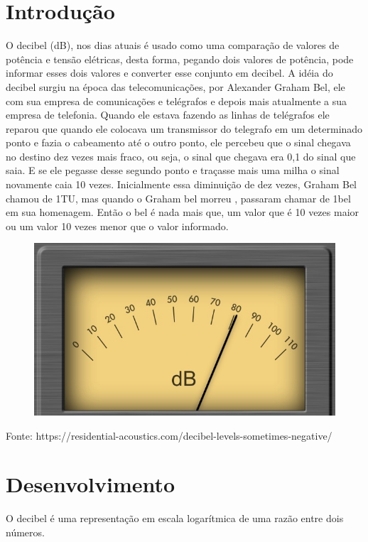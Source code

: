 \documentclass{article}
\begin{document}
\section{Introdução}
    O decibel (dB), nos dias atuais é usado como uma comparação de valores de potência e tensão elétricas, desta forma, pegando dois valores de potência, pode informar esses dois valores e converter esse conjunto em decibel.
    A idéia do decibel surgiu na época das telecomunicações, por Alexander Graham Bel, ele com sua empresa de comunicações e telégrafos e depois mais atualmente a sua empresa de telefonia.
    Quando ele estava fazendo as linhas de telégrafos ele reparou que quando ele colocava um transmissor do telegrafo em um determinado ponto e fazia o cabeamento até o outro ponto, ele percebeu que o sinal chegava no destino dez vezes mais fraco, ou seja, o sinal que chegava era 0,1 do sinal que saia. E se ele pegasse desse segundo ponto e traçasse mais uma milha o sinal novamente caia 10 vezes. Inicialmente essa diminuição de dez vezes, Graham Bel chamou de 1TU, mas quando o Graham bel morreu , passaram chamar de 1bel em sua homenagem.
    Então o bel é nada mais que, um valor que é 10 vezes maior ou um valor 10 vezes menor que o valor informado.  
    \newline
    
    \begin{figure}[h]
    \centering
    \includegraphics[width = 14cm]{imagem2.jpg}
    \label{fig:my_label}
    \end{figure}
     
    Fonte: https://residential-acoustics.com/decibel-levels-sometimes-negative/
    \newpage
    
    \section{Desenvolvimento}
	O decibel é uma representação em escala logarítmica de uma razão entre dois números.
    
\end{document}
